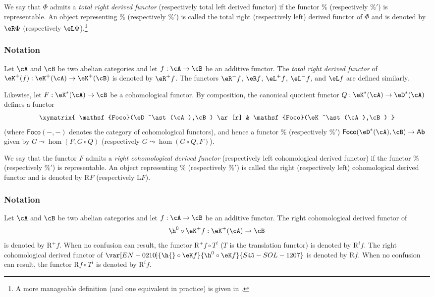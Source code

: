 \begin{definition}\label{VIII:4-1-2}
We say that $\Phi$ admits a \emph{total right derived functor}
(respectively total left derived functor) if the functor $\%$
(respectively $\%'$) is representable. An object representing $\%$
(respectively $\%'$) is called the total right (respectively left) derived
functor of $\Phi$ and is denoted by $\eR \Phi$ (respectively
$\eL \Phi$).\footnote{A more manageable definition (and one equivalent in
practice) is given in .}
\end{definition}

\subsubsection{Notation}\label{VIII:4-1-3}

Let $\cA$ and $\cB$ be two abelian categories and let $f:\cA\to \cB$ be
an additive functor. The \emph{total right derived functor} of
$\eK^+(f):\eK^+(\cA) \to \eK^+(\cB)$ is denoted by $\eR^+ f$. The
functors $\eR^- f$, $\eR f$, $\eL^+ f$, $\eL^- f$, and $\eL f$ are
defined similarly.

Likewise, let $F:\eK^\ast(\cA) \to \cB$ be a cohomological functor.
By composition, the canonical quotient functor
$Q:\eK^\ast(\cA) \to \eD^\ast(\cA)$ defines a functor
\[\xymatrix{
  \mathsf{Foco}(\eD^\ast(\cA),\cB) \ar[r]
    & \mathsf{Foco}(\eK^\ast(\cA),\cB)
}\]
(where $\mathsf{Foco}(-,-)$ denotes the category of cohomological
functors), and hence a functor $\%$ (respectively $\%'$)
$\mathsf{Foco}(\eD^\ast(\cA),\cB) \to \mathsf{Ab}$ given by
$G\leadsto \hom(F,G\circ Q)$ (respectively
$G\leadsto \hom(G\circ Q,F)$).

\begin{definition}\label{VIII:4-1-4}
We say that the functor $F$ admits a \emph{right cohomological derived
functor} (respectively left cohomological derived functor) if the functor
$\%$ (respectively $\%'$) is representable. An object representing $\%$
(respectively $\%'$) is called the right (respectively left)
cohomological derived functor and is denoted by $\mathrm{R} F$ (respectively
$\mathrm{L} F$).
\end{definition}

\subsubsection{Notation}\label{VIII:4-1-5}

Let $\cA$ and $\cB$ be two abelian categories and let $f:\cA\to \cB$ be
an additive functor. The right cohomological derived functor of
\[
  \h^0{}\circ \eK^+ f:\eK^+(\cA) \to \cB
\]
is denoted by $\mathrm{R}^+ f$. When no confusion can result, the functor
$\mathrm{R}^+ f\circ T^i$ ($T$ is the translation functor) is denoted by
$\mathrm{R}^i f$. The right cohomological derived functor of
$\var[EN-0210]{\h{}\circ \eK f}{\h^0{}\circ \eK f}{S45-SOL-1207}$ is denoted by $\mathrm{R} f$. When no confusion can result,
the functor $\mathrm{R} f\circ T^i$ is denoted by $\mathrm{R}^i f$.

